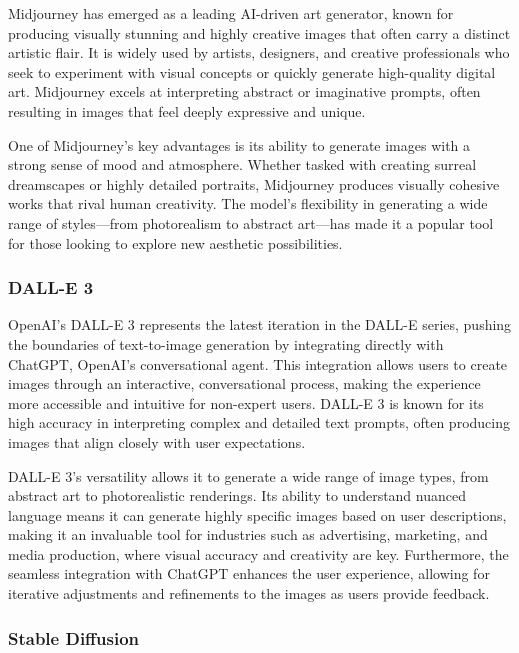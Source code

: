 Midjourney \cite{Midjourney} has emerged as a leading AI-driven art generator, known for producing visually stunning and highly creative images that often carry a distinct artistic flair. It is widely used by artists, designers, and creative professionals who seek to experiment with visual concepts or quickly generate high-quality digital art. Midjourney excels at interpreting abstract or imaginative prompts, often resulting in images that feel deeply expressive and unique.

One of Midjourney's key advantages is its ability to generate images with a strong sense of mood and atmosphere. Whether tasked with creating surreal dreamscapes or highly detailed portraits, Midjourney produces visually cohesive works that rival human creativity. The model's flexibility in generating a wide range of styles—from photorealism to abstract art—has made it a popular tool for those looking to explore new aesthetic possibilities.

\subsubsection{DALL-E 3}

OpenAI's DALL-E 3 \cite{DALLE3} represents the latest iteration in the DALL-E series, pushing the boundaries of text-to-image generation by integrating directly with ChatGPT, OpenAI's conversational agent. This integration allows users to create images through an interactive, conversational process, making the experience more accessible and intuitive for non-expert users. DALL-E 3 is known for its high accuracy in interpreting complex and detailed text prompts, often producing images that align closely with user expectations.

DALL-E 3's versatility allows it to generate a wide range of image types, from abstract art to photorealistic renderings. Its ability to understand nuanced language means it can generate highly specific images based on user descriptions, making it an invaluable tool for industries such as advertising, marketing, and media production, where visual accuracy and creativity are key. Furthermore, the seamless integration with ChatGPT enhances the user experience, allowing for iterative adjustments and refinements to the images as users provide feedback.

\subsubsection{Stable Diffusion}

